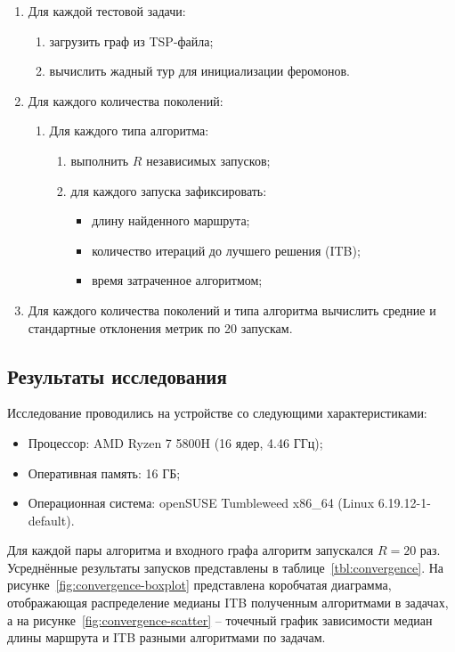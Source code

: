 \begin{enumerate}
	\item Для каждой тестовой задачи:
	\begin{enumerate}
		\item загрузить граф из TSP-файла;
		\item вычислить жадный тур для инициализации феромонов.
	\end{enumerate}
	\item Для каждого количества поколений:
	\begin{enumerate}
		\item Для каждого типа алгоритма:
		\begin{enumerate}
			\item выполнить $R$ независимых запусков;
			\item для каждого запуска зафиксировать:
			\begin{itemize}
				\item длину найденного маршрута;
				\item количество итераций до лучшего решения (ITB);
				\item время затраченное алгоритмом;
			\end{itemize}
		\end{enumerate}
	\end{enumerate}
	\item Для каждого количества поколений и типа алгоритма вычислить средние и стандартные отклонения метрик по 20 запускам.
\end{enumerate}

\subsection{Результаты исследования}

Исследование проводились на устройстве со следующими характеристиками:

\begin{itemize}
	\item Процессор: AMD Ryzen 7 5800H (16 ядер, 4.46 ГГц);
	\item Оперативная память: 16 ГБ;
	\item Операционная система: openSUSE Tumbleweed x86\_64 (Linux 6.19.12-1-default).
\end{itemize}

Для каждой пары алгоритма и входного графа алгоритм запускался $R = 20$ раз. Усреднённые результаты запусков представлены в таблице~\ref{tbl:convergence}. На рисунке~\ref{fig:convergence-boxplot} представлена коробчатая диаграмма, отображающая распределение медианы ITB полученным алгоритмами в задачах, а на рисунке~\ref{fig:convergence-scatter} -- точечный график зависимости медиан длины маршрута и ITB разными алгоритмами по задачам.

